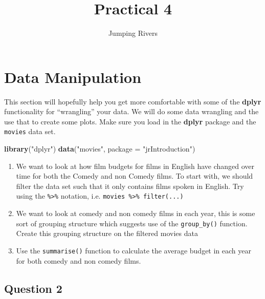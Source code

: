 \documentclass[]{tufte-handout}
\title{Practical 4}
\author{Jumping Rivers}
\date{}
\newenvironment{Shaded}{}{}
\newcommand{\DataTypeTok}[1]{\textcolor[rgb]{0.56,0.13,0.00}{#1}}
\newcommand{\KeywordTok}[1]{\textcolor[rgb]{0.00,0.44,0.13}{\textbf{#1}}}
\newcommand{\NormalTok}[1]{#1}
\newcommand{\StringTok}[1]{\textcolor[rgb]{0.25,0.44,0.63}{#1}}
\begin{document}
\maketitle




\hypertarget{data-manipulation}{%
\section{Data Manipulation}\label{data-manipulation}}

This section will hopefully help you get more comfortable with some of
the \textbf{dplyr} functionality for ``wrangling'' your data. We will do
some data wrangling and the use that to create some plots. Make sure you
load in the \textbf{dplyr} package and the \texttt{movies} data set.

\begin{Shaded}
\begin{Highlighting}[]
\KeywordTok{library}\NormalTok{(}\StringTok{"dplyr"}\NormalTok{)}
\KeywordTok{data}\NormalTok{(}\StringTok{"movies"}\NormalTok{, }\DataTypeTok{package =} \StringTok{"jrIntroduction"}\NormalTok{)}
\end{Highlighting}
\end{Shaded}

\begin{enumerate}
\def\labelenumi{\arabic{enumi}.}
\item
  We want to look at how film budgets for films in English have changed
  over time for both the Comedy and non Comedy films. To start with, we
  should filter the data set such that it only contains films spoken in
  English. Try using the \texttt{\%\textgreater{}\%} notation, i.e.
  \texttt{movies\ \%\textgreater{}\%\ filter(...)}
\item
  We want to look at comedy and non comedy films in each year, this is
  some sort of grouping structure which suggests use of the
  \texttt{group\_by()} function. Create this grouping structure on the
  filtered movies data
\item
  Use the \texttt{summarise()} function to calculate the average budget
  in each year for both comedy and non comedy films.
\end{enumerate}

\hypertarget{question-2}{%
\subsection{Question 2}\label{question-2}}
\end{document}
